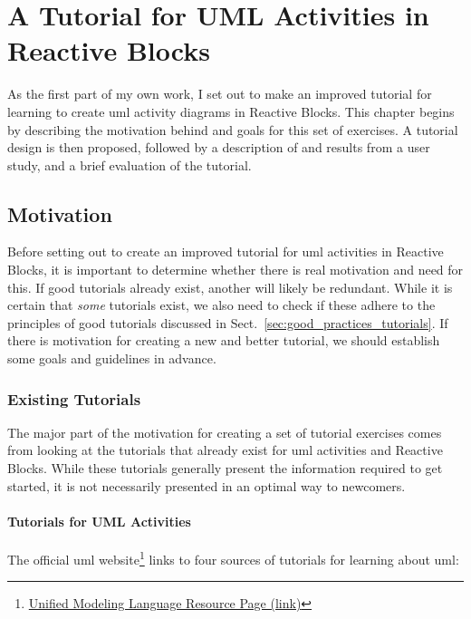 \chapter{A Tutorial for UML Activities in Reactive Blocks}
\label{ch:reactive_blocks_tutorial}
As the first part of my own work, I set out to make an improved tutorial for learning to create \gls{uml} activity diagrams in Reactive Blocks. This chapter begins by describing the motivation behind and goals for this set of exercises. A tutorial design is then proposed, followed by a description of and results from a user study, and a brief evaluation of the tutorial.

\section{Motivation}
\label{sec:tutorial_motivation}
Before setting out to create an improved tutorial for \gls{uml} activities in Reactive Blocks, it is important to determine whether there is real motivation and need for this. If good tutorials already exist, another will likely be redundant. While it is certain that \emph{some} tutorials exist, we also need to check if these adhere to the principles of good tutorials discussed in Sect.~\ref{sec:good_practices_tutorials}. If there is motivation for creating a new and better tutorial, we should establish some goals and guidelines in advance.

\subsection{Existing Tutorials}
\label{sec:existing_tutorials}
The major part of the motivation for creating a set of tutorial exercises comes from looking at the tutorials that already exist for \gls{uml} activities and Reactive Blocks. While these tutorials generally present the information required to get started, it is not necessarily presented in an optimal way to newcomers.

\subsubsection{Tutorials for UML Activities}
The official \gls{uml} website\footnote{\href{http://www.uml.org/\#Links-Tutorials}{Unified Modeling Language Resource Page (link)}} links to four sources of tutorials for learning about \gls{uml}:

